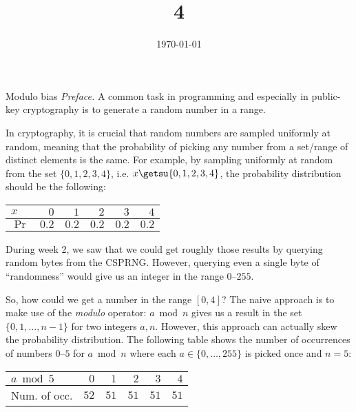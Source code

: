 \documentclass{practice}
\title{4}
\date{\today}
\begin{document}
\maketitle

\begin{task}{Modulo bias}
  \textit{Preface.}
  A common task in programming and especially in public-key cryptography is to generate a random number in a range.

  In cryptography, it is crucial that random numbers are sampled uniformly at random, meaning that the probability of picking any number from a set/range of distinct elements is the same.
  For example, by sampling uniformly at random from the set $\{0, 1, 2, 3, 4\}$, i.e. $x\getsu\{0, 1, 2, 3, 4\}$, the probability distribution should be the following:
  \begin{center}
    \begin{tabular}{l r r r r r}
      \toprule
      $x$ & $0$ & $1$ & $2$ & $3$ & $4$\\
      \midrule
      $\Pr$ & $0.2$ & $0.2$ & $0.2$ & $0.2$ & $0.2$\\
      \bottomrule
    \end{tabular}
  \end{center}

  During week 2, we saw that we could get roughly those results by querying random bytes from the CSPRNG.
  However, querying even a single byte of \enquote{randomness} would give us an integer in the range $0$--$255$.

  \iffalse
  In general, getting a random number in the range $[0, 2^n - 1]$ is `easy' since then we could just bit-mask the bytes gotten from the CSPRNG.
  For example, if we want a random number in the range $[0, 7]$, we simply need to isolate the first three bits of a random byte: \texttt{0b111} is $7$.
  \fi

  So, how could we get a number in the range $[0, 4]$?
  The naive approach is to make use of the \emph{modulo} operator: $a \bmod n$ gives us a result in the set $\{0, 1, \dots, n-1\}$ for two integers $a, n$.
  However, this approach can actually skew the probability distribution.
  The following table shows the number of occurrences of numbers $0$--$5$ for $a \bmod n$ where each $a\in\{0, \dots, 255\}$ is picked once and $n = 5$:
  \begin{center}
    \begin{tabular}{l r r r r r}
      \toprule
      $a \bmod 5$ & $0$ & $1$ & $2$ & $3$ & $4$\\
      \midrule
      Num. of occ. & $52$ & $51$ & $51$ & $51$ & $51$\\
      \bottomrule
    \end{tabular}
  \end{center}


\end{task}
\end{document}
